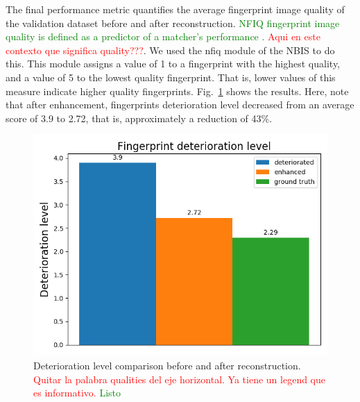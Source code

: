 \documentclass[a4paper,fleqn]{cas-dc}
\begin{document}
The final performance metric quantifies the average fingerprint image quality of the validation dataset before and after reconstruction. \textcolor{green}{NFIQ fingerprint image quality is defined as a predictor of a matcher’s performance \cite{Tabassi2009}.} \textcolor{red}{Aqui en este contexto que significa quality???}. We used the nfiq module of the NBIS to do this. This module assigns a value of 1 to a fingerprint with the highest quality, and a value of 5 to the lowest quality fingerprint. That is, lower values of this measure indicate higher quality fingerprints.  Fig.~\ref{fig11} shows the results. Here, note that after enhancement, fingerprints deterioration level decreased from an average score of 3.9 to 2.72, that is, approximately a reduction of 43\%.
\begin{figure}[htbp]
\centerline{\includegraphics[scale=0.54]{figs/mean_qualities.png}}
\caption{Deterioration level comparison before and after reconstruction. \textcolor{red}{Quitar la palabra qualities del eje horizontal. Ya tiene un legend que es informativo.} \textcolor{green}{Listo}}
\label{fig11}
\end{figure}

\end{document}
